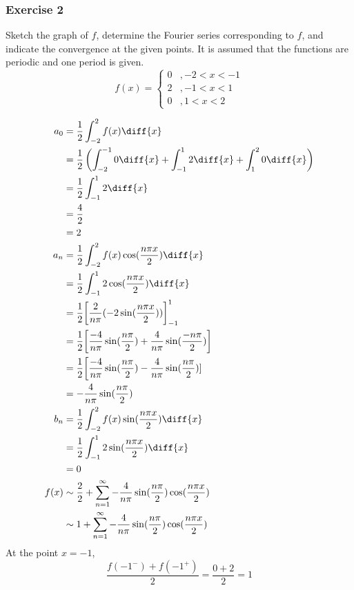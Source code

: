 \documentclass{math}
\begin{document}
\subsubsection*{Exercise 2}
Sketch the graph of \( f \), determine the Fourier series corresponding to
\( f \), and indicate the convergence at the given points. It is assumed that
the functions are periodic and one period is given.
\[ f(x) = \begin{cases}
  0 &, -2<x<-1 \\
  2 &, -1<x<1 \\
  0 &, 1<x<2
\end{cases} \]
\begin{center}
\end{center}
\begin{align*}
  a_0 &= \frac{1}{2}\int_{-2}^{2}f(x)\diff{x} \\
  &= \frac{1}{2}\left(\int_{-2}^{-1}0\diff{x}+\int_{-1}^{1}2\diff{x}+
    \int_{1}^{2}0\diff{x}\right) \\
  &= \frac{1}{2}\int_{-1}^{1}2\diff{x} \\
  &= \frac{4}{2} \\
  &= 2 \\
  a_n &= \frac{1}{2}\int_{-2}^{2}f(x)\cos(\frac{n\pi x}{2})\diff{x} \\
  &= \frac{1}{2}\int_{-1}^{1}2\cos(\frac{n\pi x}{2})\diff{x} \\
  &= \frac{1}{2}\bigg[\frac{2}{n\pi}(-2\sin(\frac{n\pi x}{2}))\bigg]_{-1}^{1} \\
  &= \frac{1}{2}\bigg[\frac{-4}{n\pi}\sin(\frac{n\pi}{2})+
    \frac{4}{n\pi}\sin(\frac{-n\pi}{2})\bigg] \\
  &= \frac{1}{2}\bigg[\frac{-4}{n\pi}\sin(\frac{n\pi}{2})-
    \frac{4}{n\pi}\sin(\frac{n\pi}{2})] \\
  &= -\frac{4}{n\pi}\sin(\frac{n\pi}{2}) \\
  b_n &= \frac{1}{2}\int_{-2}^{2}f(x)\sin(\frac{n\pi x}{2})\diff{x} \\
  &= \frac{1}{2}\int_{-1}^{1}2\sin(\frac{n\pi x}{2})\diff{x} \\
  &= 0 \\
  f(x) &\sim \frac{2}{2}+\sum_{n=1}^{\infty}
    -\frac{4}{n\pi}\sin(\frac{n\pi}{2})\cos(\frac{n\pi x}{2}) \\
  &\sim 1+\sum_{n=1}^{\infty}
    -\frac{4}{n\pi}\sin(\frac{n\pi}{2})\cos(\frac{n\pi x}{2})
\end{align*}
At the point \( x = -1 \),
\[ \frac{f(-1^-)+f(-1^+)}{2} = \frac{0+2}{2} = 1 \]
\end{document}
